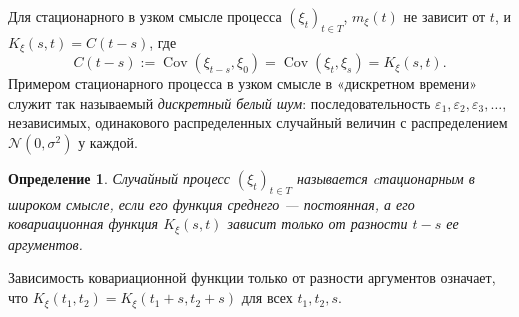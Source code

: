 \documentclass[10pt]{article}
\newtheorem{defn}[thm]{Определение}
\theoremstyle{boldnormal}
\theoremstyle{boldremark}
\begin{document}
Для стационарного в узком смысле процесса 
\((\xi_t)_{t\in T}\), $m_\xi(t)$ не зависит от \(t\), и
 $K_\xi(s,t) = C(t-s)$, где 
 $$
 C(t-s) := \operatorname{Cov}(\xi_{t-s}, \xi_0) = \operatorname{Cov}(\xi_t, \xi_s)
 = K_{\xi}(s,t).
$$
Примером стационарного процесса в узком смысле в «дискретном времени» служит
так называемый \textit{дискретный белый шум}: последовательность
$\varepsilon_1, \varepsilon_2, \varepsilon_3, \dots$, независимых, одинакового 
распределенных случайный величин с распределением 
$\mathcal{N}(0, \sigma^2)$ у каждой.
\begin{defn}
Случайный процесс $(\xi_t)_{t \in T}$
называется \emph{cтационарным в широком смысле}, если
его функция среднего --- постоянная, а его ковариационная функция 
\(K_{\xi}(s,t)\) зависит только от разности \(t-s\) ее аргументов.
\end{defn}
Зависимость ковариационной функции только от разности 
аргументов означает, что \(K_{\xi}(t_1,t_2)=K_{\xi}(t_1+s,t_2+s)\) для всех 
\(t_1,t_2,s\).
\end{document}
